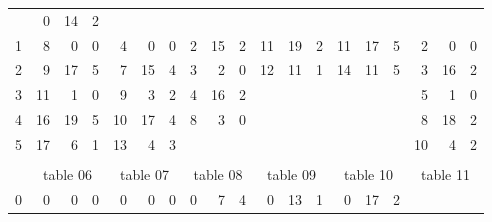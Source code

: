 \begin{esempio}
\begin{figure}[H]
{\begin{tabular}{r|rrr|rrr|rrr|rrr|rrr|rrr}
                                                       &  \textcolor{nordcyan}{0} & \textcolor{nordcyan}{14} &  \textcolor{nordcyan}{2} \\
        1 &  8 &  0 &  0 &  4 &  0 &  0 &  2 & 15 &  2 & 11 & 19 &  2 & 11 & 17 &  5 &  2 &  0 &  0 \\
        2 &  \textcolor{nordred}{9} & \textcolor{nordred}{17} &  \textcolor{nordred}{5}
                                                                                                                       &  7 & 15 &  4 &  3 &  2 &  0 & 12 & 11 &  1 & 14 & 11 &  5 &  \textcolor{nordred}{3} & \textcolor{nordred}{16} &  \textcolor{nordred}{2} \\
        3 & 11 &  1 &  0 &  9 &  3 &  2 &  \textcolor{nordcyan}{4} & \textcolor{nordcyan}{16} &  \textcolor{nordcyan}{2}
                         &    &    &    &    &    &    &  5 &  1 &  0 \\
        4 & 16 & 19 &  5 & 10 & 17 &  4 &  \textcolor{nordred}{8} &  \textcolor{nordred}{3} &  \textcolor{nordred}{0}
                         &    &    &    &    &    &    &  8 & 18 &  2 \\
        5 & 17 &  6 &  1 & \textcolor{nordred}{13} &  \textcolor{nordred}{4} &  \textcolor{nordred}{3}
          &    &    &    &    &    &    &    &    &    & 10 &  4 &  2 \\
        \multicolumn{7}{c}{} \\[3ex]
        \multicolumn{1}{c}{} &
                               \multicolumn{3}{c}{table 06} &
                                                             \multicolumn{3}{c}{table 07} &
                                                                                           \multicolumn{3}{c}{table 08} &
                                                                                                                         \multicolumn{3}{c}{table 09} &
                                                                                                                                                        \multicolumn{3}{c}{table 10} &
                                                                                                                                                                                       \multicolumn{3}{c}{table 11} \\
        \hline
        0 &  0 &  0 &  0 &  0 &  0 &  0 &  \textcolor{nordcyan}{0} &  \textcolor{nordcyan}{7} &  \textcolor{nordcyan}{4}
                         &  0 & 13 &  1 &  \textcolor{nordred}{0} & \textcolor{nordred}{17} &  \textcolor{nordred}{2}

\end{tabular}}
\end{figure}
\end{esempio}
